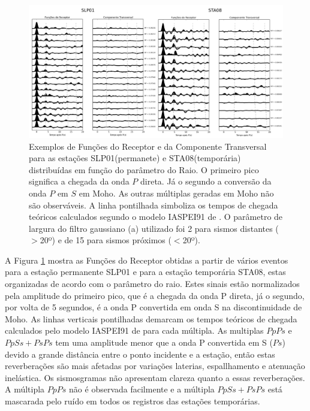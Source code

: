 \begin{figure}[!ht]
\centering
\includegraphics[scale=0.16]{Figs/RF_SLP01_STA08.png}
\caption[Exemplos de Funções do Receptor e da Componente Transversal para as estações SLP01 (permanete) e STA08 (temporária) distribuídas em função do parâmetro do Raio.]{Exemplos de Funções do Receptor e da Componente Transversal para as estações SLP01(permanete) e STA08(temporária) distribuídas em função do parâmetro do Raio. O primeiro pico significa a chegada da onda $P$ direta. Já o segundo a conversão da onda $P$ em $S$ em Moho. As outras múltiplas geradas em Moho não são observáveis. A linha pontilhada simboliza os tempos de chegada teóricos calculados segundo o modelo IASPEI91 de \cite{kennet_iaspei_1991}. O parâmetro de largura do filtro gaussiano (a) utilizado foi 2 para sismos distantes ($>$20º) e de 15 para sismos próximos ($<$20º). }
\label{RF_SLP01_STA08}
\end{figure}

A Figura \ref{RF_SLP01_STA08} mostra as Funções do Receptor obtidas a partir de vários eventos para a estação permanente SLP01 e para a estação temporária STA08, estas organizadas de acordo com o parâmetro do raio. Estes sinais estão normalizados pela amplitude do primeiro pico, que é a chegada da onda P direta, já o segundo, por volta de 5 segundos, é a onda P convertida em onda S na discontinuidade de Moho. As linhas verticais pontilhadas demarcam os tempos teóricos de chegada calculados pelo modelo IASPEI91 de \cite{kennet_iaspei_1991} para cada múltipla. As multiplas $PpPs$ e $PpSs+PsPs$ tem uma amplitude menor que a onda P convertida em S ($Ps$) devido a grande distância entre o ponto incidente e a estação, então estas reverberações são mais afetadas por variações laterias, espallhamento e atenuação inelástica. Os sismosgramas não apresentam clareza quanto a essas reverberações. A múltipla $PpPs$ não é observada facilmente e a múltipla $PpSs+PsPs$ está mascarada pelo ruído em todos os registros das estações temporárias.


